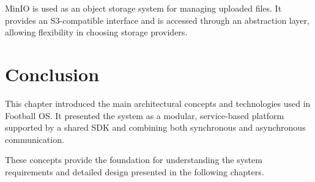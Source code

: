 MinIO is used as an object storage system for managing uploaded files.
It provides an S3-compatible interface and is accessed through an
abstraction layer, allowing flexibility in choosing storage providers.

\section*{Conclusion}

This chapter introduced the main architectural concepts and technologies
used in Football OS. It presented the system as a modular, service-based
platform supported by a shared SDK and combining both synchronous and
asynchronous communication.

These concepts provide the foundation for understanding the system
requirements and detailed design presented in the following chapters.
